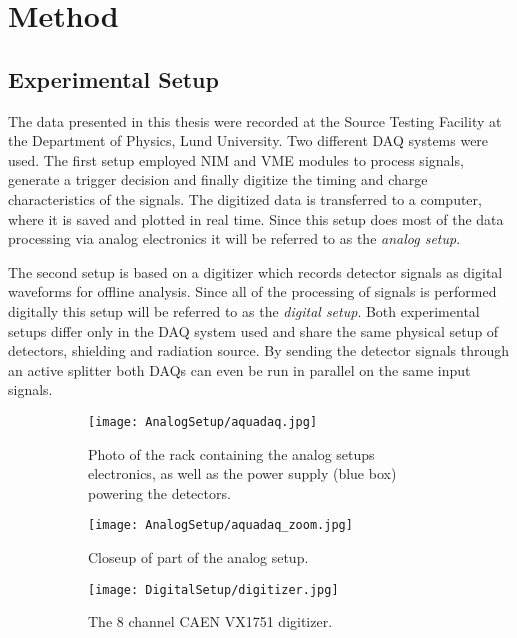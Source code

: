 \documentclass[main.tex]{subfiles}
\begin{document}
\chapter{Method}
\section{Experimental Setup}
The data presented in this thesis were recorded at the Source Testing Facility at the Department of Physics, Lund University. Two different DAQ systems were used. The first setup employed NIM and VME modules to process signals, generate a trigger decision and finally digitize the timing and charge characteristics of the signals. The digitized data is transferred to a computer, where it is saved and plotted in real time. Since this setup does most of the data processing via analog electronics it will be referred to as the \textit{analog setup}. 

The second setup is based on a digitizer which records detector signals as digital waveforms for offline analysis. Since all of the processing of signals is performed digitally this setup will be referred to as the \textit{digital setup}. 
Both experimental setups differ only in the DAQ system used and share the same physical setup of detectors, shielding and radiation source. By sending the detector signals through an active splitter both DAQs can even be run in parallel on the same input signals.


\begin{figure}[ht]
	\begin{subfigure}[b]{0.5\textwidth}
	    \centering
			\captionsetup{width=.80\linewidth}	
    	    \texttt{[image: AnalogSetup/aquadaq.jpg]}
        	\caption[Photograph of analog DAQ electronics]{Photo of the rack containing the analog setups electronics, as well as the power supply (blue box) powering the detectors.}
	    \label{fig:aquadaq_image} 
	\end{subfigure}
	\begin{subfigure}[b]{0.24\textwidth}
	    \centering
	    	\captionsetup{width=1\linewidth}	
    	    \texttt{[image: AnalogSetup/aquadaq\_zoom.jpg]}
        	\caption[Photograph of analog VME modules]{Closeup of part of the analog setup.}
	    \label{fig:aquadaq_zoom_image} 
	\end{subfigure}
	\begin{subfigure}[b]{0.24\textwidth}
    	\centering
			\captionsetup{width=.6\linewidth}	
        	\texttt{[image: DigitalSetup/digitizer.jpg]}
        	\caption[Photograph of the CAEN VX1751 digitizer]{The 8 channel CAEN VX1751 digitizer.}
    	\label{fig:digitizer_image} 
    \end{subfigure}
    \caption[Photograps of the analog DAQ setup and the digitizer.]{}
\end{figure}
\end{document}
